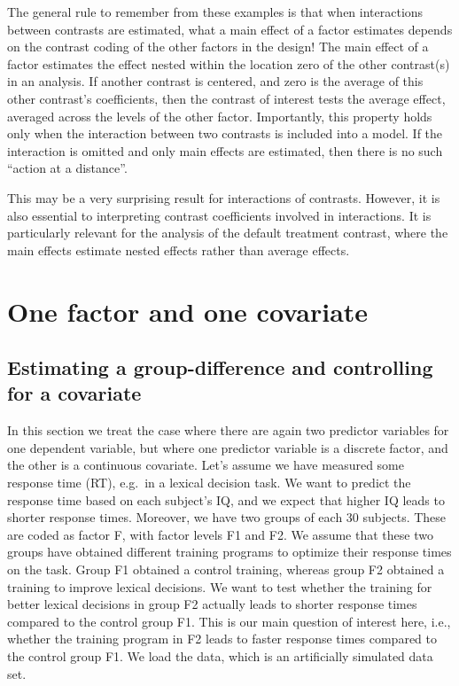 \documentclass[12pt,]{krantz}
\begin{document}
The general rule to remember from these examples is that when interactions between contrasts are estimated, what a main effect of a factor estimates depends on the contrast coding of the other factors in the design! The main effect of a factor estimates the effect nested within the location zero of the other contrast(s) in an analysis. If another contrast is centered, and zero is the average of this other contrast's coefficients, then the contrast of interest tests the average effect, averaged across the levels of the other factor. Importantly, this property holds only when the interaction between two contrasts is included into a model. If the interaction is omitted and only main effects are estimated, then there is no such ``action at a distance''.

This may be a very surprising result for interactions of contrasts. However, it is also essential to interpreting contrast coefficients involved in interactions. It is particularly relevant for the analysis of the default treatment contrast, where the main effects estimate nested effects rather than average effects.

\hypertarget{sec:contrast:covariate}{%
\section{One factor and one covariate}\label{sec:contrast:covariate}}

\hypertarget{estimating-a-group-difference-and-controlling-for-a-covariate}{%
\subsection{Estimating a group-difference and controlling for a covariate}\label{estimating-a-group-difference-and-controlling-for-a-covariate}}

In this section we treat the case where there are again two predictor variables for one dependent variable, but where one predictor variable is a discrete factor, and the other is a continuous covariate. Let's assume we have measured some response time (RT), e.g.~in a lexical decision task. We want to predict the response time based on each subject's IQ, and we expect that higher IQ leads to shorter response times. Moreover, we have two groups of each 30 subjects. These are coded as factor F, with factor levels F1 and F2. We assume that these two groups have obtained different training programs to optimize their response times on the task. Group F1 obtained a control training, whereas group F2 obtained a training to improve lexical decisions. We want to test whether the training for better lexical decisions in group F2 actually leads to shorter response times compared to the control group F1. This is our main question of interest here, i.e., whether the training program in F2 leads to faster response times compared to the control group F1. We load the data, which is an artificially simulated data set.
\end{document}
